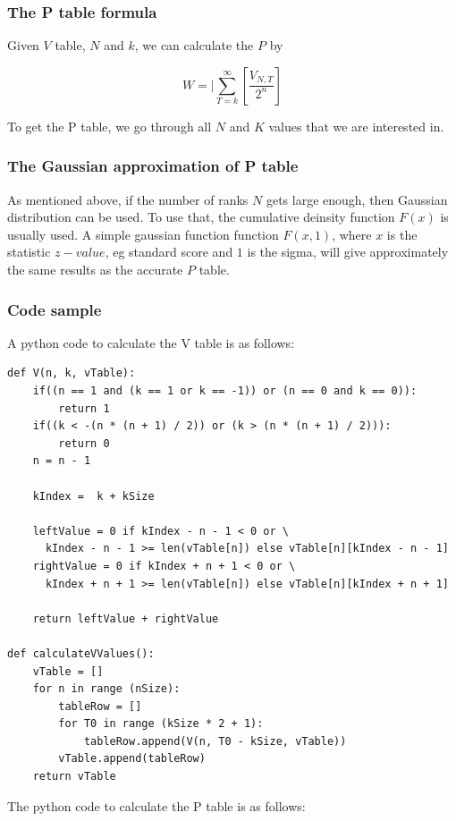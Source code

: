 \documentclass[12pt]{article}
\begin{document}
\subsubsection{The P table formula}
Given $V$ table, $N$ and $k$, we can calculate the $P$ by

\begin{equation}
W=|\sum\limits_{T = k}^{\infty}[\frac{V_{N, T}}{2^n}]
\end{equation}

To get the P table, we go through all $N$ and $K$ values that we are interested in.

\subsubsection{The Gaussian approximation of P table}
As mentioned above, if the number of ranks $N$ gets large enough, then Gaussian distribution can be used. To use that, the cumulative deinsity function $F(x)$ is usually used. A simple gaussian function function $F(x, 1)$, where $x$ is the statistic $z-value$, eg standard score and $1$ is the sigma, will give approximately the same results as the accurate $P$ table.

\subsubsection{Code sample}
A python code to calculate the V table is as follows:
\begin{verbatim}
def V(n, k, vTable):
    if((n == 1 and (k == 1 or k == -1)) or (n == 0 and k == 0)):
        return 1
    if((k < -(n * (n + 1) / 2)) or (k > (n * (n + 1) / 2))):
        return 0
    n = n - 1

    kIndex =  k + kSize

    leftValue = 0 if kIndex - n - 1 < 0 or \
      kIndex - n - 1 >= len(vTable[n]) else vTable[n][kIndex - n - 1]
    rightValue = 0 if kIndex + n + 1 < 0 or \
      kIndex + n + 1 >= len(vTable[n]) else vTable[n][kIndex + n + 1]

    return leftValue + rightValue

def calculateVValues():
    vTable = []
    for n in range (nSize):
        tableRow = []
        for T0 in range (kSize * 2 + 1):
            tableRow.append(V(n, T0 - kSize, vTable))
        vTable.append(tableRow)
    return vTable

\end{verbatim}

The python code to calculate the P table is as follows:
\end{document}
